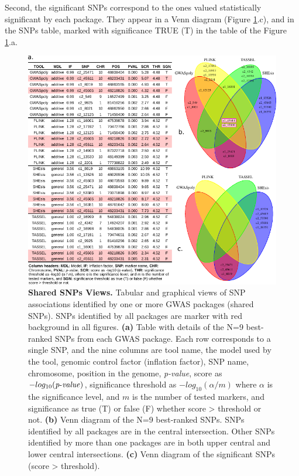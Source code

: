 \documentclass{article}
\begin{document}
Second, the significant SNPs correspond to the ones valued statistically significant by each package. They appear in a Venn diagram (Figure \ref{fig:Table-Shared-SNPs}.c), and in the SNPs table, marked with significance TRUE (T) in the table of the Figure \ref{fig:Table-Shared-SNPs}.a.

\begin{figure}[H]
\begin{centering}
\includegraphics{images/paper-table-venn-best}
\par\end{centering}
\caption{\textbf{Shared SNPs Views. } Tabular and graphical views of SNP associations identified by one or more GWAS packages (shared SNPs). SNPs identified by all packages are marker with red background in all figures. \textbf{(a)} Table with details of the N=9 best-ranked SNPs from each GWAS package. Each row corresponds to a single SNP, and the nine columns are tool name,
the model used by the tool, genomic control factor (inflation factor), SNP name, chromosome, position in the genome, \emph{p-value}, score
as $-log_{10}({\operatorname{\mathit{p-value}}})$, significance threshold as $-log_{10}(\alpha/m)$ where $\alpha$ is the significance level, and $m$ is the number of
tested markers, and significance as true (T) or false (F) whether score > threshold or not. \textbf{(b)} Venn diagram of the N=9 best-ranked SNPs. SNPs identified by all packages are in the central intersection. Other SNPs identified by more than one packages are in both upper central and lower central intersections. \textbf{(c)} Venn diagram of the significant SNPs (score > threshold). \label{fig:Table-Shared-SNPs}}
\end{figure}
\end{document}
